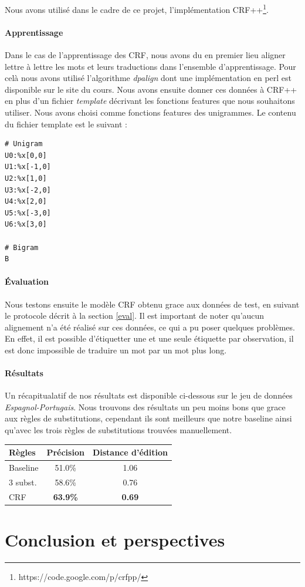 \documentclass{article}
\begin{document}
Nous avons utilisé dans le cadre de ce projet, l'implémentation CRF++\footnote{https://code.google.com/p/crfpp/}.

\paragraph{Apprentissage}
Dans le cas de l'apprentissage des CRF, nous avons du en premier lieu aligner lettre à lettre les mots et leurs traductions dans l'ensemble d'apprentissage. Pour celà nous avons utilisé l'algorithme \emph{dpalign} dont une implémentation en perl est disponible sur le site du cours. Nous avons ensuite donner ces données à CRF++ en plus d'un fichier \emph{template} décrivant les fonctions features que nous souhaitons utiliser. Nous avons choisi comme fonctions features des unigrammes. Le contenu du fichier template est le suivant :
\begin{verbatim}
# Unigram
U0:%x[0,0]
U1:%x[-1,0]
U2:%x[1,0]
U3:%x[-2,0]
U4:%x[2,0]
U5:%x[-3,0]
U6:%x[3,0]

# Bigram
B
\end{verbatim}

\paragraph{Évaluation}
Nous testons ensuite le modèle CRF obtenu grace aux données de test, en suivant le protocole décrit à la section \ref{eval}. Il est important de noter qu'aucun alignement n'a été réalisé sur ces données, ce qui a pu poser quelques problèmes. En effet, il est possible d'étiquetter une et une seule étiquette par observation, il est donc impossible de traduire un mot par un mot plus long.

\paragraph{Résultats}
Un récapitualatif de nos résultats est disponible ci-dessous sur le jeu de données \emph{Espagnol-Portugais}. Nous trouvons des résultats un peu moins bons que grace aux règles de substitutions, cependant ils sont meilleurs que notre baseline ainsi qu'avec les trois règles de substitutions trouvées manuellement.
\begin{center}
\begin{tabular}{|l|c|c|}
\hline
Règles&Précision&Distance d'édition\\
\hline
Baseline&51.0\%&1.06\\
\hline
3 subst.&58.6\%&0.76\\
\hline
CRF&\textbf{63.9\%}&\textbf{0.69}\\
\hline
\end{tabular}
\end{center}

\section{Conclusion et perspectives}
\nocite{*}


\end{document}
